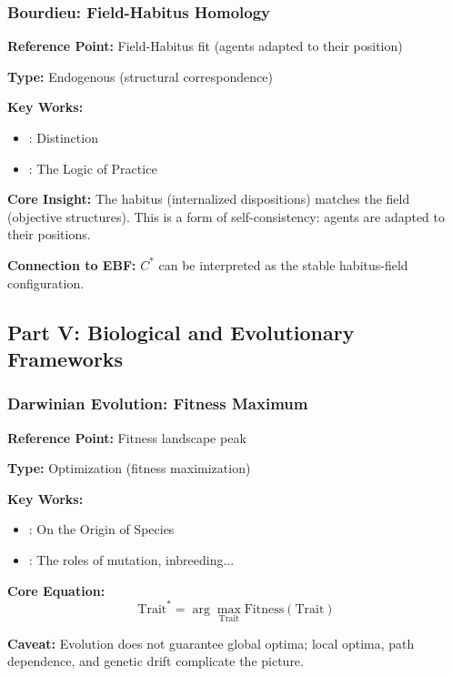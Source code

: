 \subsubsection{Bourdieu: Field-Habitus Homology}

\begin{tcolorbox}[colback=gray!5!white, colframe=gray!75!black]
\textbf{Reference Point:} Field-Habitus fit (agents adapted to their position)

\textbf{Type:} Endogenous (structural correspondence)

\textbf{Key Works:}
\begin{itemize}[nosep]
    \item \citet{bourdieu1984}: Distinction
    \item \citet{bourdieu1990}: The Logic of Practice
\end{itemize}

\textbf{Core Insight:}
The habitus (internalized dispositions) matches the field (objective structures).
This is a form of self-consistency: agents are adapted to their positions.

\textbf{Connection to EBF:}
$C^*$ can be interpreted as the stable habitus-field configuration.
\end{tcolorbox}



\subsection{Part V: Biological and Evolutionary Frameworks}
\label{sec:AY-biology}

\subsubsection{Darwinian Evolution: Fitness Maximum}

\begin{tcolorbox}[colback=gray!5!white, colframe=gray!75!black]
\textbf{Reference Point:} Fitness landscape peak

\textbf{Type:} Optimization (fitness maximization)

\textbf{Key Works:}
\begin{itemize}[nosep]
    \item \citet{darwin1859}: On the Origin of Species
    \item \citet{wright1932}: The roles of mutation, inbreeding...
\end{itemize}

\textbf{Core Equation:}
\begin{equation}
\text{Trait}^* = \arg\max_{\text{Trait}} \text{Fitness}(\text{Trait})
\end{equation}

\textbf{Caveat:}
Evolution does not guarantee global optima; local optima, path dependence,
and genetic drift complicate the picture.
\end{tcolorbox}

